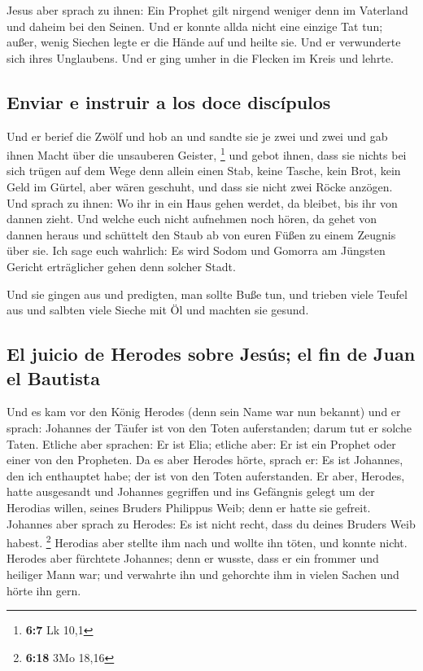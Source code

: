  Jesus aber sprach zu ihnen: Ein Prophet gilt nirgend
weniger denn im Vaterland und daheim bei den Seinen.  Und
er konnte allda nicht eine einzige Tat tun; außer, wenig Siechen legte
er die Hände auf und heilte sie.  Und er verwunderte sich
ihres Unglaubens. Und er ging umher in die Flecken im Kreis und lehrte.

\hypertarget{enviar-e-instruir-a-los-doce-discuxedpulos}{%
\subsection{Enviar e instruir a los doce
discípulos}\label{enviar-e-instruir-a-los-doce-discuxedpulos}}

 Und er berief die Zwölf und hob an und sandte sie je zwei
und zwei und gab ihnen Macht über die unsauberen Geister, \footnote{\textbf{6:7}
  Lk 10,1}  und gebot ihnen, dass sie nichts bei sich
trügen auf dem Wege denn allein einen Stab, keine Tasche, kein Brot,
kein Geld im Gürtel,  aber wären geschuht, und dass sie
nicht zwei Röcke anzögen.  Und sprach zu ihnen: Wo ihr in
ein Haus gehen werdet, da bleibet, bis ihr von dannen zieht.
 Und welche euch nicht aufnehmen noch hören, da gehet von
dannen heraus und schüttelt den Staub ab von euren Füßen zu einem
Zeugnis über sie. Ich sage euch wahrlich: Es wird Sodom und Gomorra am
Jüngsten Gericht erträglicher gehen denn solcher Stadt.

 Und sie gingen aus und predigten, man sollte Buße tun,
 und trieben viele Teufel aus und salbten viele Sieche
mit Öl und machten sie gesund.

\hypertarget{el-juicio-de-herodes-sobre-jesuxfas-el-fin-de-juan-el-bautista}{%
\subsection{El juicio de Herodes sobre Jesús; el fin de Juan el
Bautista}\label{el-juicio-de-herodes-sobre-jesuxfas-el-fin-de-juan-el-bautista}}

 Und es kam vor den König Herodes (denn sein Name war nun
bekannt) und er sprach: Johannes der Täufer ist von den Toten
auferstanden; darum tut er solche Taten.  Etliche aber
sprachen: Er ist Elia; etliche aber: Er ist ein Prophet oder einer von
den Propheten.  Da es aber Herodes hörte, sprach er: Es
ist Johannes, den ich enthauptet habe; der ist von den Toten
auferstanden.  Er aber, Herodes, hatte ausgesandt und
Johannes gegriffen und ins Gefängnis gelegt um der Herodias willen,
seines Bruders Philippus Weib; denn er hatte sie gefreit.
 Johannes aber sprach zu Herodes: Es ist nicht recht,
dass du deines Bruders Weib habest. \footnote{\textbf{6:18} 3Mo 18,16}
 Herodias aber stellte ihm nach und wollte ihn töten, und
konnte nicht.  Herodes aber fürchtete Johannes; denn er
wusste, dass er ein frommer und heiliger Mann war; und verwahrte ihn und
gehorchte ihm in vielen Sachen und hörte ihn gern.


